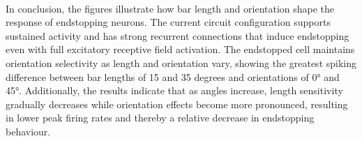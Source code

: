 \documentclass[12pt]{article}
\begin{document}
\\
In conclusion, the figures illustrate how bar length and orientation shape the response of endstopping neurons. The current circuit configuration supports sustained activity and has strong recurrent connections that induce endstopping even with full excitatory receptive field activation. The endstopped cell maintains orientation selectivity as length and orientation vary, showing the greatest spiking difference between bar lengths of 15 and 35 degrees and orientations of 0° and 45°. Additionally, the results indicate that as angles increase, length sensitivity gradually decreases while orientation effects become more pronounced, resulting in lower peak firing rates and thereby a relative decrease in endstopping behaviour.
\end{document}
